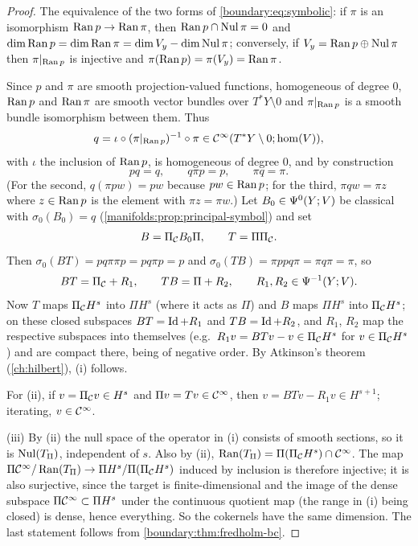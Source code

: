 \begin{proof}
The equivalence of the two forms of \eqref{boundary:eq:symbolic}: if $\pi$ is an
isomorphism $\operatorname{Ran} p\to\operatorname{Ran}\pi$, then $\operatorname{Ran} p\cap\operatorname{Nul}\pi=0$ and $\dim\operatorname{Ran} p=\dim\operatorname{Ran}\pi=
\dim V_y-\dim\operatorname{Nul}\pi$; conversely, if $V_y=\operatorname{Ran} p\oplus\operatorname{Nul}\pi$ then $\pi|_{\operatorname{Ran} p}$ is
injective and $\pi(\operatorname{Ran} p)=\pi(V_y)=\operatorname{Ran}\pi$.

Since $p$ and $\pi$ are smooth projection-valued functions, homogeneous of degree $0$,
$\operatorname{Ran} p$ and $\operatorname{Ran}\pi$ are smooth vector bundles over $T^*Y\setminus0$ and
$\pi|_{\operatorname{Ran} p}$ is a smooth bundle isomorphism between them. Thus
\begin{equation*}
q=\iota\circ(\pi|_{\operatorname{Ran} p})^{-1}\circ\pi\in\mathcal{C}^\infty(T^*Y\setminus0;\hom(V)),
\end{equation*}
with $\iota$ the inclusion of $\operatorname{Ran} p$, is homogeneous of degree $0$, and by construction
\begin{equation*}
pq=q,\qquad q\pi p=p,\qquad \pi q=\pi.
\end{equation*}
(For the second, $q(\pi pw)=pw$ because $pw\in\operatorname{Ran} p$; for the third, $\pi qw=\pi z$
where $z\in\operatorname{Ran} p$ is the element with $\pi z=\pi w$.) Let $B_0\in\Psi^{0}(Y;V)$ be classical with $\sigma_0(B_0)=q$
(\cref{manifolds:prop:principal-symbol}) and set
\begin{equation*}
B=\Pi_{\mathcal{C}} B_0\Pi,\qquad T=\Pi\Pi_{\mathcal{C}} .
\end{equation*}
Then $\sigma_0(BT)=pq\pi\pi p=pq\pi p=p$ and $\sigma_0(TB)=\pi pp q\pi=\pi q\pi=\pi$, so
\begin{equation*}
BT=\Pi_{\mathcal{C}}+R_1,\qquad TB=\Pi+R_2,\qquad R_1,R_2\in\Psi^{-1}(Y;V).
\end{equation*}
Now $T$ maps $\Pi_{\mathcal{C}} H^s$ into $\Pi H^s$ (where it acts as $\Pi$) and $B$ maps $\Pi H^s$
into $\Pi_{\mathcal{C}} H^s$; on these closed subspaces $BT=\operatorname{Id}+R_1$ and $TB=\operatorname{Id}+R_2$, and $R_1$,
$R_2$ map the respective subspaces into themselves (e.g.\ $R_1v=BTv-v\in\Pi_{\mathcal{C}} H^s$ for $v\in
\Pi_{\mathcal{C}} H^s$) and are compact there, being of negative order. By Atkinson's theorem
(\cref{ch:hilbert}), (i) follows.

For (ii), if $v=\Pi_{\mathcal{C}} v\in H^s$ and $\Pi v=Tv\in\mathcal{C}^\infty$, then $v=BTv-R_1v\in H^{s+1}$;
iterating, $v\in\mathcal{C}^\infty$.

(iii) By (ii) the null space of the operator in (i) consists of smooth sections, so it is
$\operatorname{Nul}(T_\Pi)$, independent of $s$. Also by (ii), $\operatorname{Ran}(T_\Pi)=\Pi(\Pi_{\mathcal{C}} H^s)\cap\mathcal{C}^\infty$. The map
$\Pi\mathcal{C}^\infty/\operatorname{Ran}(T_\Pi)\to\Pi H^s/\Pi(\Pi_{\mathcal{C}} H^s)$ induced by inclusion is therefore injective;
it is also surjective, since the target is finite-dimensional and the image of the dense
subspace $\Pi\mathcal{C}^\infty\subset\Pi H^s$ under the continuous quotient map (the range in (i) being
closed) is dense, hence everything. So the cokernels have the same dimension. The last
statement follows from \cref{boundary:thm:fredholm-bc}.
\end{proof}

